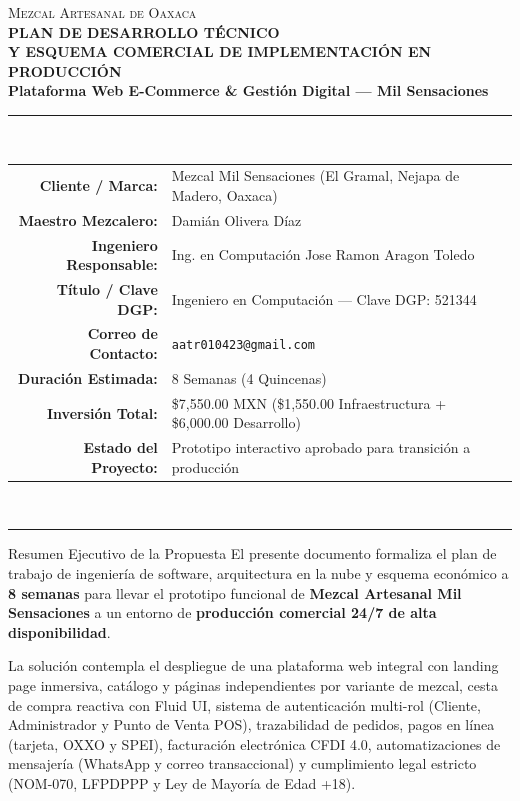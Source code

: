\documentclass[11pt,letterpaper]{article}
\begin{document}
\begin{center}
    {\scshape\Large Mezcal Artesanal de Oaxaca}\\[0.2cm]
    {\Huge\textbf{\color{MezcalAgave}PLAN DE DESARROLLO TÉCNICO}}\\[0.15cm]
    {\Large\textbf{\color{MezcalGold}Y ESQUEMA COMERCIAL DE IMPLEMENTACIÓN EN PRODUCCIÓN}}\\[0.3cm]
    {\large\textbf{Plataforma Web E-Commerce \& Gestión Digital — Mil Sensaciones}}\\[0.4cm]
    \rule{0.85\textwidth}{1.5pt}\\[0.3cm]
    \begin{tabular}{rl}
        \textbf{Cliente / Marca:} & Mezcal Mil Sensaciones (El Gramal, Nejapa de Madero, Oaxaca) \\
        \textbf{Maestro Mezcalero:} & Damián Olivera Díaz \\
        \textbf{Ingeniero Responsable:} & Ing. en Computación Jose Ramon Aragon Toledo \\
        \textbf{Título / Clave DGP:} & Ingeniero en Computación — Clave DGP: 521344 \\
        \textbf{Correo de Contacto:} & \texttt{aatr010423@gmail.com} \\
        \textbf{Duración Estimada:} & 8 Semanas (4 Quincenas) \\
        \textbf{Inversión Total:} & \$7,550.00 MXN (\$1,550.00 Infraestructura + \$6,000.00 Desarrollo) \\
        \textbf{Estado del Proyecto:} & Prototipo interactivo aprobado para transición a producción
    \end{tabular}
    \\[0.3cm]
    \rule{0.85\textwidth}{1.5pt}
\end{center}

\vspace{0.3cm}

\begin{resumenbox}{Resumen Ejecutivo de la Propuesta}
El presente documento formaliza el plan de trabajo de ingeniería de software, arquitectura en la nube y esquema económico a \textbf{8 semanas} para llevar el prototipo funcional de \textbf{Mezcal Artesanal Mil Sensaciones} a un entorno de \textbf{producción comercial 24/7 de alta disponibilidad}.

La solución contempla el despliegue de una plataforma web integral con landing page inmersiva, catálogo y páginas independientes por variante de mezcal, cesta de compra reactiva con Fluid UI, sistema de autenticación multi-rol (Cliente, Administrador y Punto de Venta POS), trazabilidad de pedidos, pagos en línea (tarjeta, OXXO y SPEI), facturación electrónica CFDI 4.0, automatizaciones de mensajería (WhatsApp y correo transaccional) y cumplimiento legal estricto (NOM-070, LFPDPPP y Ley de Mayoría de Edad +18).
\end{resumenbox}
\end{document}
